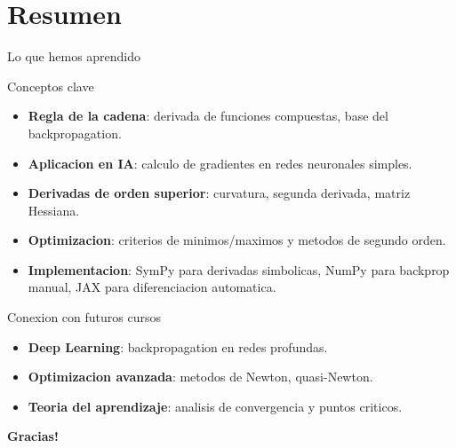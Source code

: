 \documentclass[aspectratio=169, 10pt, xcolor=table]{beamer}
\begin{document}
\section{Resumen}

\begin{frame}{Lo que hemos aprendido}
    \begin{exampleblock}{Conceptos clave}
        \begin{itemize}
            \item \textbf{Regla de la cadena}: derivada de funciones compuestas, base del backpropagation.
            \item \textbf{Aplicacion en IA}: calculo de gradientes en redes neuronales simples.
            \item \textbf{Derivadas de orden superior}: curvatura, segunda derivada, matriz Hessiana.
            \item \textbf{Optimizacion}: criterios de minimos/maximos y metodos de segundo orden.
            \item \textbf{Implementacion}: SymPy para derivadas simbolicas, NumPy para backprop manual, JAX para diferenciacion automatica.
        \end{itemize}
    \end{exampleblock}
\end{frame}

\begin{frame}{Conexion con futuros cursos}
    \begin{itemize}
        \item \textbf{Deep Learning}: backpropagation en redes profundas.
        \item \textbf{Optimizacion avanzada}: metodos de Newton, quasi-Newton.
        \item \textbf{Teoria del aprendizaje}: analisis de convergencia y puntos criticos.
    \end{itemize}
\end{frame}

\begin{frame}
    \centering
    \Huge \textbf{Gracias!}

\end{frame}
\end{document}

